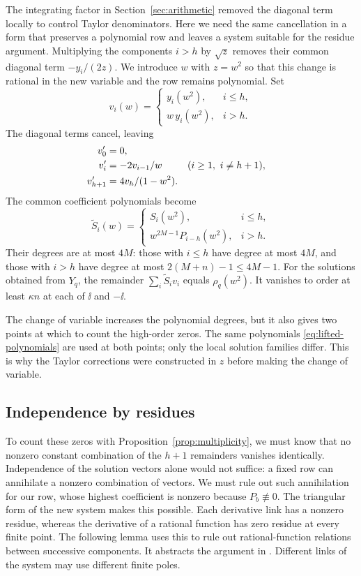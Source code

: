 The integrating factor in Section~\ref{sec:arithmetic} removed the
diagonal term locally to control Taylor denominators. Here we need the
same cancellation in a form that preserves a polynomial row and leaves
a system suitable for the residue argument.
Multiplying the components $i>h$ by $\sqrt z$ removes their common
diagonal term $-y_i/(2z)$. We introduce $w$ with $z=w^2$ so that this
change is rational in the new variable and the row remains polynomial. Set
\[
 v_i(w)=
 \begin{cases}
 y_i(w^2),&i\leq h,\\
 w\,y_i(w^2),&i>h.
 \end{cases}
\]
The diagonal terms cancel, leaving
\begin{align}
 v_0'&=0,\notag\\
 v_i'&=-2v_{i-1}/w &&(i\geq1,\ i\neq h+1),\label{eq:lifted-system}\\
 v_{h+1}'&=4v_h/(1-w^2).\notag
\end{align}
The common coefficient polynomials become
\begin{equation}\label{eq:lifted-polynomials}
 \widetilde S_i(w)=
 \begin{cases}
 S_i(w^2),&i\leq h,\\
 w^{2M-1}P_{i-h}(w^2),&i>h.
 \end{cases}
\end{equation}
Their degrees are at most $4M$: those with $i\leq h$ have degree at
most $4M$, and those with $i>h$ have degree at most
$2(M+n)-1\leq4M-1$.
For the solutions obtained from $Y_q$, the remainder
$\sum_i\widetilde S_i v_i$ equals $\rho_q(w^2)$.
It vanishes to order at least $\kappa n$ at each of $\ii$ and $-\ii$.

The change of variable increases the polynomial degrees, but it also
gives two points at which to count the high-order zeros.
The same polynomials \eqref{eq:lifted-polynomials} are used at both
points; only the local solution families differ.
This is why the Taylor corrections were constructed in $z$ before
making the change of variable.

\subsection{Independence by residues}

To count these zeros with Proposition~\ref{prop:multiplicity}, we must
know that no nonzero constant combination of the $h+1$ remainders
vanishes identically. Independence of the solution vectors alone would
not suffice: a fixed row can annihilate a nonzero combination of vectors.
We must rule out such annihilation for our row, whose highest coefficient
is nonzero because $P_b\not\equiv0$.
The triangular form of the new system makes this possible.
Each derivative link has a nonzero residue, whereas the
derivative of a rational function has zero residue at every finite point.
The following lemma uses this to rule out rational-function relations
between successive components. It abstracts the argument in
\cite[Section~4.5, Step~4]{F26}. Different links of the system may use
different finite poles.

